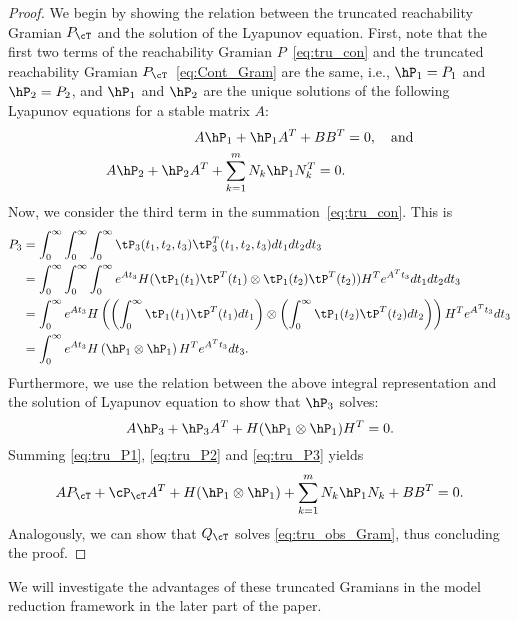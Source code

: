 	\begin{proof}
		We begin by showing the relation between the truncated reachability Gramian $P_\cT$ and the solution of the Lyapunov equation. First, note that the first two terms of the reachability Gramian $P$~\eqref{eq:tru_con} and the truncated reachability Gramian $P_\cT$~\eqref{eq:Cont_Gram} are the same, i.e., $\hP_1 = P_1$ and $\hP_2 = P_2$, and $\hP_1$ and $\hP_2$ are the unique solutions of the following Lyapunov equations for a stable matrix $A$:
		\begin{align}
		A\hP_1 + \hP_1A^T +BB^T &=0, \quad\text{and} \label{eq:tru_P1}\\
		A\hP_2 + \hP_2A^T + \sum_{k=1}^mN_k\hP_1N_k^T = 0.\label{eq:tru_P2}
		\end{align}
		Now, we consider the third term in the summation~\eqref{eq:tru_con}. This is 
		\begin{align*}
		 P_3 &= \int_0^\infty\int_0^\infty\int_0^\infty \tP_3(t_1,t_2,t_3)\tP_3^T(t_1,t_2,t_3) dt_1dt_2dt_3\\
		 &= \int_0^\infty\int_0^\infty\int_0^\infty e^{At_3}H (\tP_1(t_1)\tP^T(t_1)\otimes \tP_1(t_2)\tP^T(t_2))H^T e^{A^Tt_3}dt_1dt_2dt_3 \\
 		 &= \int_0^\infty e^{At_3}H \left( \left(\int_0^\infty \tP_1(t_1)\tP^T(t_1)dt_1\right)\otimes \left(\int_0^\infty\tP_1(t_2)\tP^T(t_2)dt_2\right)\right)H^T e^{A^Tt_3}dt_3 \\
 		 &= \int_0^\infty e^{At_3}H \left( \hP_1 \otimes \hP_1\right)H^T e^{A^Tt_3}dt_3. 
		 \end{align*}
		 Furthermore, we use the relation between the above integral representation and the solution of Lyapunov equation to show that $\hP_3$ solves:
		 \begin{equation}\label{eq:tru_P3}
		 A\hP_3 + \hP_3A^T + H(\hP_1\otimes \hP_1)H^T =0 .
		 \end{equation}
		 Summing \eqref{eq:tru_P1}, \eqref{eq:tru_P2} and \eqref{eq:tru_P3} yields
		 \begin{equation}
		 AP_\cT + \cP_{\cT}A^T + H(\hP_1\otimes \hP_1)  + \sum_{k=1}^mN_k\hP_1N_k + BB^T=0.
		 \end{equation}
		 Analogously, we can show that $Q_\cT$ solves \eqref{eq:tru_obs_Gram}, thus concluding the proof.
	\end{proof}
	
	We will investigate the advantages of these truncated Gramians in the model reduction framework  in the later part of the paper.
	
